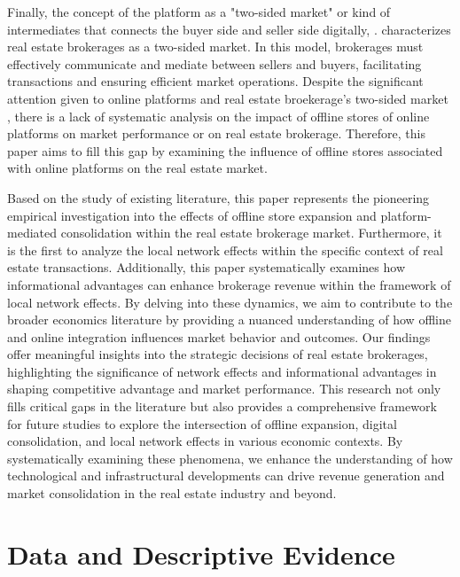 \documentclass[11pt]{article}
\begin{document}
Finally, the concept of the platform as a "two-sided market" or kind of intermediates that connects the buyer side and seller side digitally, \citep{10.1162/154247603322493212, Langley_Leyshon_2017, 10.1257/aer.100.4.1642}. \citet{https://doi.org/10.1111/j.1756-2171.2006.tb00036.x} characterizes real estate brokerages as a two-sided market. In this model, brokerages must effectively communicate and mediate between sellers and buyers, facilitating transactions and ensuring efficient market operations. Despite the significant attention given to online platforms and real estate broekerage's two-sided market \citep{10.1257/jep.23.3.125}, there is a lack of systematic analysis on the impact of offline stores of online platforms on market performance or on real estate brokerage. Therefore, this paper aims to fill this gap by examining the influence of offline stores associated with online platforms on the real estate market.

Based on the study of existing literature, this paper represents the pioneering empirical investigation into the effects of offline store expansion and platform-mediated consolidation within the real estate brokerage market. Furthermore, it is the first to analyze the local network effects within the specific context of real estate transactions. Additionally, this paper systematically examines how informational advantages can enhance brokerage revenue within the framework of local network effects. By delving into these dynamics, we aim to contribute to the broader economics literature by providing a nuanced understanding of how offline and online integration influences market behavior and outcomes. Our findings offer meaningful insights into the strategic decisions of real estate brokerages, highlighting the significance of network effects and informational advantages in shaping competitive advantage and market performance. This research not only fills critical gaps in the literature but also provides a comprehensive framework for future studies to explore the intersection of offline expansion, digital consolidation, and local network effects in various economic contexts. By systematically examining these phenomena, we enhance the understanding of how technological and infrastructural developments can drive revenue generation and market consolidation in the real estate industry and beyond.

\section{Data and Descriptive Evidence \label{sec:data}}
\end{document}

